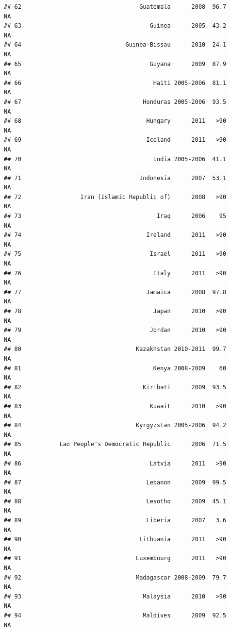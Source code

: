 \documentclass[
]{book}
\begin{document}
\begin{verbatim}
## 62                                  Guatemala      2008  96.7              NA
## 63                                     Guinea      2005  43.2              NA
## 64                              Guinea-Bissau      2010  24.1              NA
## 65                                     Guyana      2009  87.9              NA
## 66                                      Haiti 2005-2006  81.1              NA
## 67                                   Honduras 2005-2006  93.5              NA
## 68                                    Hungary      2011   >90              NA
## 69                                    Iceland      2011   >90              NA
## 70                                      India 2005-2006  41.1              NA
## 71                                  Indonesia      2007  53.1              NA
## 72                 Iran (Islamic Republic of)      2008   >90              NA
## 73                                       Iraq      2006    95              NA
## 74                                    Ireland      2011   >90              NA
## 75                                     Israel      2011   >90              NA
## 76                                      Italy      2011   >90              NA
## 77                                    Jamaica      2008  97.8              NA
## 78                                      Japan      2010   >90              NA
## 79                                     Jordan      2010   >90              NA
## 80                                 Kazakhstan 2010-2011  99.7              NA
## 81                                      Kenya 2008-2009    60              NA
## 82                                   Kiribati      2009  93.5              NA
## 83                                     Kuwait      2010   >90              NA
## 84                                 Kyrgyzstan 2005-2006  94.2              NA
## 85           Lao People's Democratic Republic      2006  71.5              NA
## 86                                     Latvia      2011   >90              NA
## 87                                    Lebanon      2009  99.5              NA
## 88                                    Lesotho      2009  45.1              NA
## 89                                    Liberia      2007   3.6              NA
## 90                                  Lithuania      2011   >90              NA
## 91                                 Luxembourg      2011   >90              NA
## 92                                 Madagascar 2008-2009  79.7              NA
## 93                                   Malaysia      2010   >90              NA
## 94                                   Maldives      2009  92.5              NA

\end{verbatim}
\end{document}
